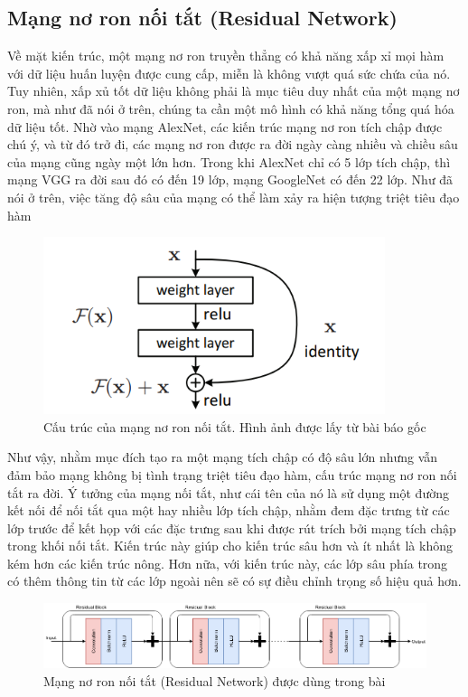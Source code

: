 \subsection{Mạng nơ ron nối tắt (Residual Network)}

Về mặt kiến trúc, một mạng nơ ron truyền thẳng có khả năng xấp xỉ mọi hàm với dữ liệu huấn luyện được cung cấp, miễn là không vượt quá sức chứa của nó. Tuy nhiên, xấp xủ tốt dữ liệu không phải là mục tiêu duy nhất của một mạng nơ ron, mà như đã nói ở trên, chúng ta cần một mô hình có khả năng tổng quá hóa dữ liệu tốt. Nhờ vào mạng AlexNet, các kiến trúc mạng nơ ron tích chập được chú ý, và từ đó trở đi, các mạng nơ ron được ra đời ngày càng nhiều và chiều sâu của mạng cũng ngày một lớn hơn. Trong khi AlexNet chỉ có 5 lớp tích chập, thì mạng VGG ra đời sau đó có đến 19 lớp, mạng GoogleNet có đến 22 lớp. Như đã nói ở trên, việc tăng độ sâu của mạng có thể làm xảy ra hiện tượng triệt tiêu đạo hàm

\begin{figure}[H]
    \centering
    \includegraphics[width=10cm]{./content/materials/residual_orig.png}
    \caption{Cấu trúc của mạng nơ ron nối tắt. Hình ảnh được lấy từ bài báo gốc \cite{residual}}
\end{figure}

Như vậy, nhằm mục đích tạo ra một mạng tích chập có độ sâu lớn nhưng vẫn đảm bảo mạng không bị tình trạng triệt tiêu đạo hàm, cấu trúc mạng nơ ron nối tắt ra đời. Ý tưởng của mạng nối tắt, như cái tên của nó là sử dụng một đường kết nối để nối tắt qua một hay nhiều lớp tích chập, nhằm đem đặc trưng từ các lớp trước để kết họp với các đặc trưng sau khi được rút trích bởi mạng tích chập trong khối nối tắt. Kiến trúc này giúp cho kiến trúc sâu hơn và ít nhất là không kém hơn các kiến trúc nông. Hơn nữa, với kiến trúc này, các lớp sâu phía trong có thêm thông tin từ các lớp ngoài nên sẽ có sự điều chỉnh trọng số hiệu quả hơn.

\begin{figure}[H]
    \centering
    \includegraphics[width=15cm]{./content/materials/residual.png}
    \caption{Mạng nơ ron nối tắt (Residual Network) được dùng trong bài}
\end{figure}

